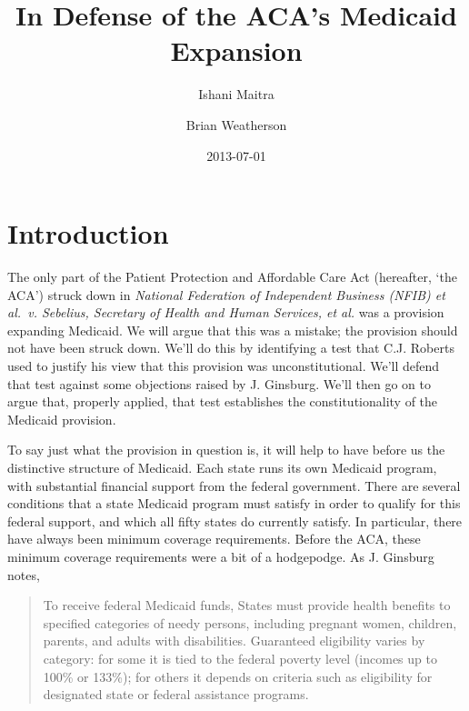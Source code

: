 \documentclass[
  11pt,
  letterpaper,
  DIV=11,
  numbers=noendperiod,
  oneside]{scrartcl}
\title{In Defense of the ACA's Medicaid Expansion}
\author{Ishani Maitra \and Brian Weatherson}
\date{2013-07-01}
\begin{document}
\maketitle
\section{Introduction}\label{introduction}

The only part of the Patient Protection and Affordable Care Act
(hereafter, `the ACA') struck down in \emph{National Federation of
Independent Business (NFIB) et al.~v. Sebelius, Secretary of Health and
Human Services, et al.} was a provision expanding Medicaid. We
will argue that this was a mistake; the provision should not have been
struck down. We'll do this by identifying a test that C.J. Roberts used
to justify his view that this provision was unconstitutional. We'll
defend that test against some objections raised by J. Ginsburg. We'll
then go on to argue that, properly applied, that test establishes the
constitutionality of the Medicaid provision.


To say just what the provision in question is, it will help to have
before us the distinctive structure of Medicaid. Each state runs its own
Medicaid program, with substantial financial support from the federal
government. There are several conditions that a state Medicaid program
must satisfy in order to qualify for this federal support, and which all
fifty states do currently satisfy. In particular, there have always been
minimum coverage requirements. Before the ACA,
these minimum coverage requirements were a bit of a hodgepodge. As J.
Ginsburg notes,

\begin{quote}
To receive federal Medicaid funds, States must provide health benefits
to specified categories of needy persons, including pregnant women,
children, parents, and adults with disabilities. Guaranteed eligibility
varies by category: for some it is tied to the federal poverty level
(incomes up to 100\% or 133\%); for others it depends on criteria such
as eligibility for designated state or federal assistance
programs.
\end{quote}
\end{document}
